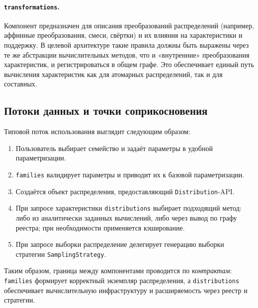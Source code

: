 \paragraph{\texttt{transformations}.}
Компонент предназначен для описания преобразований распределений (например, аффинные преобразования, смеси, свёртки) и их влияния на характеристики и поддержку. В целевой архитектуре такие правила должны быть выражены через те же абстракции вычислительных методов, что и «внутренние» преобразования характеристик, и регистрироваться в общем графе. Это обеспечивает единый путь вычисления характеристик как для атомарных распределений, так и для составных.

\subsection{Потоки данных и точки соприкосновения}

Типовой поток использования выглядит следующим образом:
\begin{enumerate}[compact]
  \item Пользователь выбирает семейство и задаёт параметры в удобной параметризации.
  \item \texttt{families} валидирует параметры и приводит их к базовой параметризации.
  \item Создаётся объект распределения, предоставляющий \texttt{Distribution}-API.
  \item При запросе характеристики \texttt{distributions} выбирает подходящий метод: либо из аналитически заданных вычислений, либо через вывод по графу реестра; при необходимости применяется кэширование.
  \item При запросе выборки распределение делегирует генерацию выборки стратегии \texttt{SamplingStrategy}.
\end{enumerate}

Таким образом, граница между компонентами проводится по \emph{контрактам}: \texttt{families} формирует корректный экземпляр распределения, а \texttt{distributions} обеспечивает вычислительную инфраструктуру и расширяемость через реестр и стратегии.
